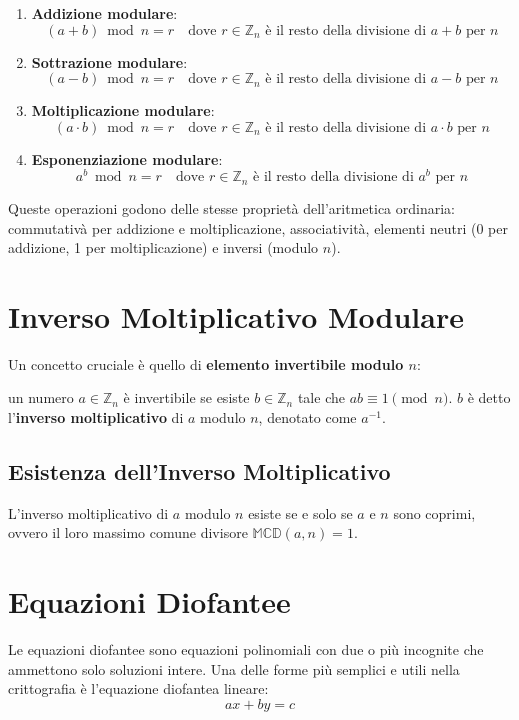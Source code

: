 \documentclass[a4paper,12pt]{report}
\begin{document}
\begin{enumerate}
    \item \textbf{Addizione modulare}:
    $$(a + b) \bmod n = r \quad \text{dove } r \in \mathbb{Z}_n \text{ è il resto della divisione di } a+b \text{ per } n$$
    
    \item \textbf{Sottrazione modulare}:
    $$(a - b) \bmod n = r \quad \text{dove } r \in \mathbb{Z}_n \text{ è il resto della divisione di } a-b \text{ per } n$$
    
    \item \textbf{Moltiplicazione modulare}:
    $$(a \cdot b) \bmod n = r \quad \text{dove } r \in \mathbb{Z}_n \text{ è il resto della divisione di } a \cdot b \text{ per } n$$
    
    \item \textbf{Esponenziazione modulare}:
    $$a^b \bmod n = r \quad \text{dove } r \in \mathbb{Z}_n \text{ è il resto della divisione di } a^b \text{ per } n$$
\end{enumerate}

Queste operazioni godono delle stesse proprietà dell'aritmetica ordinaria: commutativà per addizione e moltiplicazione, associatività, elementi neutri (0 per addizione, 1 per moltiplicazione) e inversi (modulo $n$).

\section{Inverso Moltiplicativo Modulare}

Un concetto cruciale è quello di \textbf{elemento invertibile modulo $n$}: 

un numero $a \in \mathbb{Z}_n$ è invertibile se esiste $b \in \mathbb{Z}_n$ tale che $ab \equiv 1 \pmod{n}$. $b$ è detto l'\textbf{inverso moltiplicativo} di $a$ modulo $n$, denotato come $a^{-1}$.

\subsection*{Esistenza dell'Inverso Moltiplicativo}
L'inverso moltiplicativo di $a$ modulo $n$ esiste se e solo se $a$ e $n$ sono coprimi, ovvero il loro massimo comune divisore $\mathbb{MCD}(a,n) = 1$. 

\section{Equazioni Diofantee}
Le equazioni diofantee sono equazioni polinomiali con due o più incognite che ammettono solo soluzioni intere. 
Una delle forme più semplici e utili nella crittografia è l'equazione diofantea lineare:
\[ax + by = c\]
\end{document}
